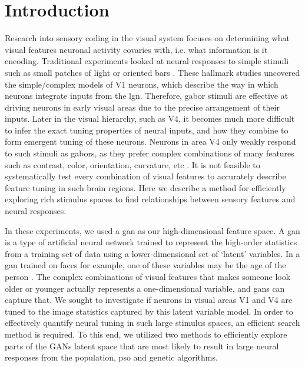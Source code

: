 \section{Introduction}
Research into sensory coding in the visual system focuses on determining what visual features neuronal activity covaries with, i.e. what information is it encoding. Traditional experiments looked at neural responses to simple stimuli such as small patches of light or oriented bars \parencite{Hubel1959}. These hallmark studies uncovered the simple/complex models of V1 neurons, which describe the way in which neurons integrate inputs from the \gls{lgn}. Therefore, gabor stimuli are effective at driving neurons in early visual areas due to the precise arrangement of their inputs. Later in the visual hierarchy, such as V4, it becomes much more difficult to infer the exact tuning properties of neural inputs, and how they combine to form emergent tuning of these neurons. Neurons in area V4 only weakly respond to such stimuli as gabors, as they prefer complex combinations of many features such as contrast, color, orientation, curvature, etc \parencite{Sani2013,Tanigawa2010, Nandy2016}. It is not feasible to systematically test every combination of visual features to accurately describe feature tuning in such brain regions. Here we describe a method for efficiently exploring rich stimulus spaces to find relationships between sensory features and neural responses.

In these experiments, we used a \gls{gan} as our high-dimensional feature space. A \gls{gan} is a type of artificial neural network trained to represent the high-order statistics from a training set of data using a lower-dimensional set of `latent’ variables. In a \gls{gan} trained on faces for example, one of these variables may be the age of the person \parencite{Karras2019}. The complex combinations of visual features that makes someone look older or younger actually represents a one-dimensional variable, and \glspl{gan} can capture that. We sought to investigate if neurons in visual areas V1 and V4 are tuned to the image statistics captured by this latent variable model. In order to effectively quantify neural tuning in such large stimulus spaces, an efficient search method is required. To this end, we utilized two methods to efficiently explore parts of the GANs latent space that are most likely to result in large neural responses from the population, \gls{pso} and genetic algorithms. 

